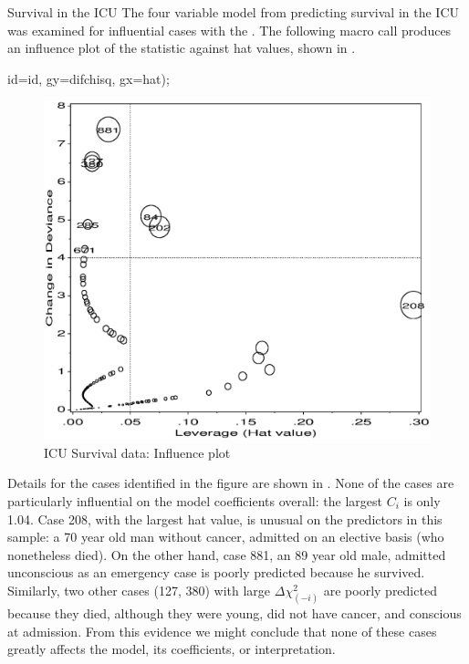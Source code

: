 \begin{Example}[icu2]{Survival in the ICU}
The four variable model from  predicting survival in the ICU
was examined for influential cases with the .
The following macro call produces an influence plot of the 
statistic against hat values, shown in .
\begin{listing}
   id=id,
   gy=difchisq,
   gx=hat);
\end{listing}

\begin{figure}[htb]
  \centering
  \includegraphics[scale=.6]{ch6/fig/icu12}
  \caption[ICU Survival data: Influence plot]{ICU Survival data: Influence plot}%
  \label{fig:icu12}
\end{figure}

Details for the cases identified in the figure are shown in .
None of the cases are particularly influential on the model coefficients overall:
the largest $C_i$ is only 1.04.
Case 208, with the largest hat value, is unusual on the predictors
in this sample: a 70 year old man without cancer, admitted on an elective
basis (who nonetheless died).
On the other hand, case 881, an 89 year old male, admitted unconscious
as an emergency case is poorly predicted because he survived.
Similarly, two other cases (127, 380) with large $\Delta \chi_{(-i)}^2$
are poorly predicted because they died, although they were
young, did not have cancer, and conscious at admission.
From this evidence we might conclude that none of these cases greatly affects the model, its coefficients,
or interpretation.
\begin{Output}[htb]
\caption{ICU data: Influential cases}\label{out:icu1.2}
\small

\end{Output}


\end{Example}

